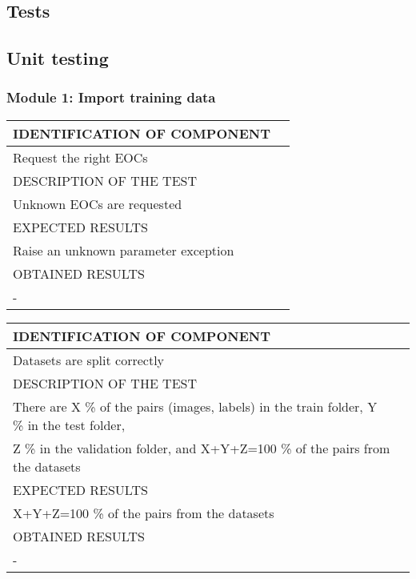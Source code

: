 \documentclass{polytech/polytech}
\numberwithin{figure}{chapter}
\begin{document}
\begin{appendix}
\chapter{Tests}

\section{Unit testing}

\subsection{Module 1: Import training data}

\begin{table}[]
\begin{tabular}{|l|l|}\hline
\color{C} IDENTIFICATION OF COMPONENT \\\hline
Request the right EOCs  \\\hline
\color{C} DESCRIPTION OF THE TEST\\\hline
Unknown EOCs are requested \\\hline
\color{C} EXPECTED RESULTS \\\hline
Raise an unknown parameter exception \\\hline
\color{C} OBTAINED RESULTS \\\hline
- \\\hline
\end{tabular}
\end{table}

\begin{table}[]
\begin{tabular}{|l|l|}\hline
\color{C} IDENTIFICATION OF COMPONENT \\\hline
Datasets are split correctly  \\\hline
\color{C} DESCRIPTION OF THE TEST\\\hline
There are X \% of the pairs (images, labels) in the train folder, Y \% in the test folder,\\ Z \% in the validation folder, and X+Y+Z=100 \% of the pairs from the datasets \\\hline
\color{C} EXPECTED RESULTS \\\hline
X+Y+Z=100 \% of the pairs from the datasets \\\hline
\color{C} OBTAINED RESULTS \\\hline
- \\\hline
\end{tabular}
\end{table}


\end{appendix}
\end{document}
